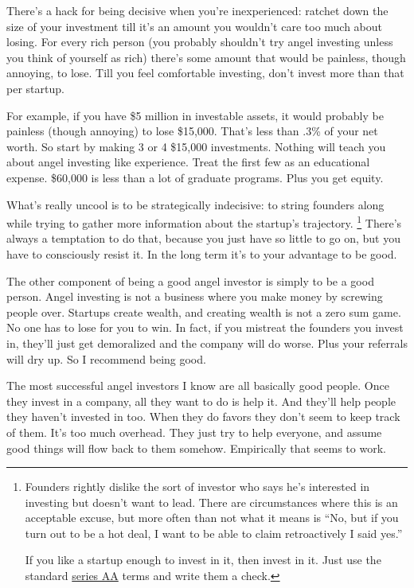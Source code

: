 \documentclass[12pt]{book}
\begin{document}
There's a hack for being decisive when you're inexperienced: ratchet
down the size of your investment till it's an amount you wouldn't care
too much about losing. For every rich person (you probably shouldn't try
angel investing unless you think of yourself as rich) there's some
amount that would be painless, though annoying, to lose. Till you feel
comfortable investing, don't invest more than that per startup.

For example, if you have \$5 million in investable assets, it would
probably be painless (though annoying) to lose \$15,000. That's less
than .3\% of your net worth. So start by making 3 or 4 \$15,000
investments. Nothing will teach you about angel investing like
experience. Treat the first few as an educational expense. \$60,000 is
less than a lot of graduate programs. Plus you get equity.

What's really uncool is to be strategically indecisive: to string
founders along while trying to gather more information about the
startup's trajectory. \footnote{Founders rightly dislike the sort of investor who says he's
interested in investing but doesn't want to lead. There are
circumstances where this is an acceptable excuse, but more often than
not what it means is ``No, but if you turn out to be a hot deal, I want
to be able to claim retroactively I said yes.''

If you like a startup enough to invest in it, then invest in it. Just
use the standard \href{http://ycombinator.com/seriesaa.html}{series AA}
terms and write them a check.} There's always a
temptation to do that, because you just have so little to go on, but you
have to consciously resist it. In the long term it's to your advantage
to be good.

The other component of being a good angel investor is simply to be a
good person. Angel investing is not a business where you make money by
screwing people over. Startups create wealth, and creating wealth is not
a zero sum game. No one has to lose for you to win. In fact, if you
mistreat the founders you invest in, they'll just get demoralized and
the company will do worse. Plus your referrals will dry up. So I
recommend being good.

The most successful angel investors I know are all basically good
people. Once they invest in a company, all they want to do is help it.
And they'll help people they haven't invested in too. When they do
favors they don't seem to keep track of them. It's too much overhead.
They just try to help everyone, and assume good things will flow back to
them somehow. Empirically that seems to work.
\end{document}
